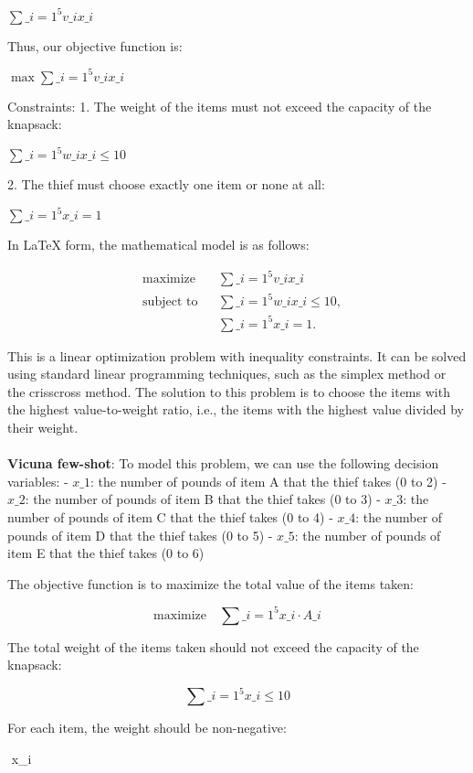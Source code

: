 \documentclass{article}%
\begin{document}
$\sum\_{i=1}^5 v\_i x\_i$

Thus, our objective function is:

$\max \sum\_{i=1}^5 v\_i x\_i$

Constraints:
1. The weight of the items must not exceed the capacity of the knapsack:

$\sum\_{i=1}^5 w\_i x\_i \leq 10$

2. The thief must choose exactly one item or none at all:

$\sum\_{i=1}^5 x\_i = 1$

In LaTeX form, the mathematical model is as follows:

\[
\begin{aligned}
& \text{maximize} && \sum\_{i=1}^5 v\_i x\_i \\
& \text{subject to} && \sum\_{i=1}^5 w\_i x\_i \leq 10, \\
&&& \sum\_{i=1}^5 x\_i = 1.
\end{aligned}
\]

This is a linear optimization problem with inequality constraints. It can be solved using standard linear programming techniques, such as the simplex method or the crisscross method. The solution to this problem is to choose the items with the highest value-to-weight ratio, i.e., the items with the highest value divided by their weight.\\\\%
\textbf{Vicuna few-shot}: To model this problem, we can use the following decision variables:
- $x\_1$: the number of pounds of item A that the thief takes (0 to 2)
- $x\_2$: the number of pounds of item B that the thief takes (0 to 3)
- $x\_3$: the number of pounds of item C that the thief takes (0 to 4)
- $x\_4$: the number of pounds of item D that the thief takes (0 to 5)
- $x\_5$: the number of pounds of item E that the thief takes (0 to 6)

The objective function is to maximize the total value of the items taken:

$$
\text{maximize} \quad \sum\_{i=1}^5 x\_i \cdot A\_i
$$

The total weight of the items taken should not exceed the capacity of the knapsack:

$$
\sum\_{i=1}^5 x\_i \leq 10
$$

For each item, the weight should be non-negative:

$$
x\_i\\\\%
\end{document}
